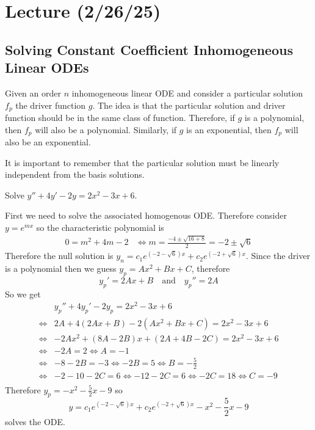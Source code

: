 \documentclass[notes]{subfiles}
\begin{document}
\setcounter{section}{11}
\section{Lecture (2/26/25)}

\subsection{Solving Constant Coefficient Inhomogeneous Linear ODEs}
Given an order $n$ inhomogeneous linear ODE and consider a particular solution $f_p$ the driver function $g$. The idea is that the particular solution and driver function should be in the same class of function. Therefore, if $g$ is a polynomial, then $f_p$ will also be a polynomial. Similarly, if $g$ is an exponential, then $f_p$ will also be an exponential.

It is important to remember that the particular solution must be linearly independent from the basis solutions.

\begin{exercise}
    Solve $y'' + 4y' - 2y = 2x^2 - 3x + 6$.
\end{exercise}
\begin{solution}
    First we need to solve the associated homogenous ODE. Therefore consider $y = e^{mx}$ so the characteristic polynomial is
    \begin{align*}
        0 = m^2 + 4m - 2
        &\iff m = \frac{-4 \pm \sqrt{16 + 8}}{2} = -2 \pm \sqrt{6}
    \end{align*}
    Therefore the null solution is $y_n = c_1e^{(-2 - \sqrt{6})x} + c_2e^{(-2 + \sqrt{6})x}$. Since the driver is a polynomial then we guess $y_p = Ax^2 + Bx + C$, therefore
    \[
        y_p' = 2Ax + B \quad \text{and} \quad y_p'' = 2A
    \]
    So we get
    \begin{align*}
        &y_p'' + 4y_p' - 2y_p = 2x^2 - 3x + 6 \\
        \iff& 2A + 4(2Ax + B) - 2(Ax^2 + Bx + C) = 2x^2 - 3x + 6 \\
        \iff& -2Ax^2 + (8A - 2B)x + (2A + 4B - 2C) = 2x^2 - 3x + 6 \\
        \iff& -2A = 2 \iff A = -1 \\
        \iff& -8 - 2B = -3 \iff -2B = 5 \iff B = -\frac{5}{2} \\
        \iff& -2 - 10 - 2C = 6 \iff -12 - 2C = 6 \iff -2C = 18 \iff C = -9 \\
    \end{align*}
    Therefore $y_p = -x^2 - \frac{5}{2}x - 9$ so
    \[
        y = c_1e^{(-2 - \sqrt{6})x} + c_2e^{(-2 + \sqrt{6})x} - x^2 - \frac{5}{2}x - 9
    \]
    solves the ODE.
\end{solution}
\end{document}
